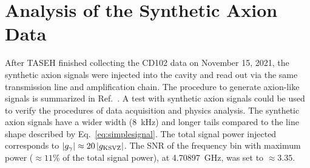 \section{Analysis of the Synthetic Axion Data}\label{sec:faxion}
After TASEH finished collecting the CD102 data on November 15, 2021, 
the synthetic axion signals were injected into the cavity and read out via the 
same transmission line and amplification chain. The procedure 
to generate axion-like signals is summarized in 
Ref.~\cite{TASEHInstrumentation}. 
A test with synthetic axion signals could be used to verify the procedures of 
data acquisition and physics analysis. The synthetic axion signals 
have a wider width (8~kHz) and longer tails compared to the line shape 
described by Eq.~\eqref{eq:simplesignal}. The total signal power injected 
corresponds to $\left|g_{\gamma}\right|\approx 20 \left|g_\text{KSVZ}\right|$. 
The SNR of the frequency bin with maximum power ($\approx 11\%$ of the 
total signal power), 
 at 4.70897~GHz, was set to $\approx 3.35$. 

